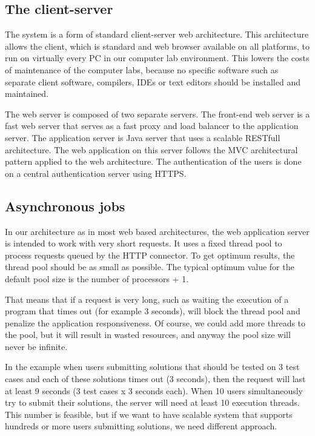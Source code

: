 \documentclass{llncs}
\begin{document}
\subsection{The client-server}

The system is a form of standard client-server web architecture. This
architecture allows the client, which is standard and web browser available on
all platforms, to run on virtually every PC in our computer lab environment.
This lowers the costs of maintenance of the computer labs, because no specific
software such as separate client software, compilers, IDEs or text editors
should be installed and maintained.

The web server is composed of two separate servers. The front-end web server is
a fast web server that serves as a fast proxy and load balancer to the
application server. The application server is Java server that uses a scalable
RESTfull architecture. The web application on this server follows the MVC
architectural pattern applied to the web architecture. The authentication of the
users is done on a central authentication server using HTTPS.

\subsection{Asynchronous jobs}

In our architecture as in most web based architectures, the web application
server is intended to work with very short requests. It uses a fixed thread pool
to process requests queued by the HTTP connector. To get optimum results, the
thread pool should be as small as possible. The typical optimum value for the
default pool size is the number of processors + 1.

That means that if a request is very long, such as waiting the execution of a
program that times out (for example 3 seconds), will block the thread pool and
penalize the application responsiveness. Of course, we could add more threads to
the pool, but it will result in wasted resources, and anyway the pool size will
never be infinite.

In the example when users submitting solutions that should be tested on 3 test
cases and each of these solutions times out (3 seconds), then the request will
last at least 9 seconds (3 test cases x 3 seconds each). When 10 users
simultaneously try to submit their solutions, the server will need at least 10
execution threads. This number is feasible, but if we want to have scalable
system that supports hundreds or more users submitting solutions, we need
different approach.
\end{document}
